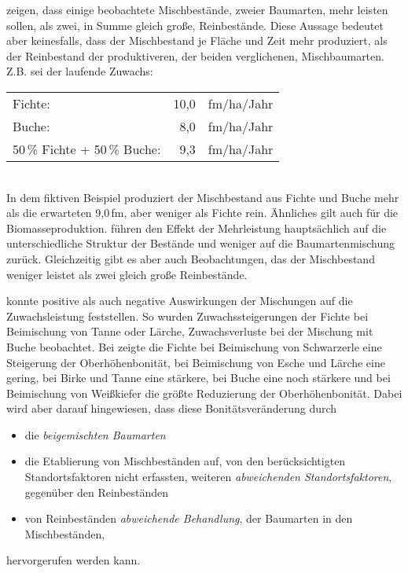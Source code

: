 \documentclass[twocolumn]{scrartcl}
\begin{document}
\cite{pretzsch2017mischwald} zeigen, dass einige beobachtete
Mischbestände, zweier Baumarten, mehr leisten sollen, als zwei, in
Summe gleich große, Reinbestände. Diese Aussage bedeutet aber
keinesfalls, dass der Mischbestand je Fläche und Zeit mehr produziert,
als der Reinbestand der produktiveren, der beiden verglichenen,
Mischbaumarten.\\
Z.B. sei der laufende Zuwachs:\\
\begin{tabular}{lr@{\,}l}
    Fichte:                      & 10,0 & fm/ha/Jahr\\
    Buche:                       &  8,0 & fm/ha/Jahr\\
    50\,\% Fichte + 50\,\% Buche: &  9,3 & fm/ha/Jahr\\
\end{tabular}\\
In dem fiktiven Beispiel produziert der Mischbestand aus Fichte und
Buche mehr als die erwarteten 9,0\,fm, aber weniger als Fichte
rein. Ähnliches gilt auch für die Biomasseproduktion.
\cite{sterba2018struktur} führen den Effekt der Mehrleistung
hauptsächlich auf die unterschiedliche Struktur der Bestände und
weniger auf die Baumartenmischung zurück. Gleichzeitig gibt es aber
auch Beobachtungen, das der Mischbestand weniger leistet als zwei
gleich große Reinbestände.
 
\cite{vospernik2021grundflaechenzuwachs} konnte positive als auch
negative Auswirkungen der Mischungen auf die Zuwachsleistung
feststellen. So wurden Zuwachssteigerungen der Fichte bei Beimischung
von Tanne oder Lärche, Zuwachsverluste bei der Mischung mit Buche
beobachtet. Bei \cite{kindermann2018siteIndex} zeigte die Fichte bei
Beimischung von Schwarzerle eine Steigerung der Oberhöhenbonität, bei
Beimischung von Esche und Lärche eine gering, bei Birke und Tanne eine
stärkere, bei Buche eine noch stärkere und bei Beimischung von
Weißkiefer die größte Reduzierung der Oberhöhenbonität. Dabei wird
aber darauf hingewiesen, dass diese Bonitätsveränderung durch
\begin{itemize}
\item die \emph{beigemischten Baumarten}
\item die Etablierung von Mischbeständen auf, von den berücksichtigten
  Standortsfaktoren nicht erfassten, weiteren \emph{abweichenden
    Standortsfaktoren}, gegenüber den Reinbeständen
\item von Reinbeständen \emph{abweichende Behandlung}, der Baumarten
  in den Mischbeständen,
\end{itemize}
hervorgerufen werden kann.
\end{document}
